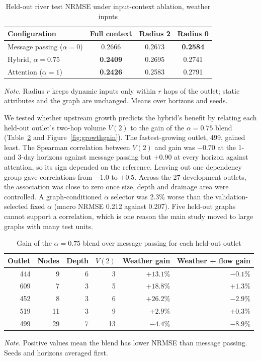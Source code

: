 \begin{table}[htbp]
\caption{Held-out river test NRMSE under input-context ablation, weather inputs}
\label{tab:context}
\centering\small
\begin{tabular}{@{}lccc@{}}
\toprule
Configuration & Full context & Radius 2 & Radius 0 \\
\midrule
Message passing ($\alpha=0$) & 0.2666 & 0.2673 & \textbf{0.2584} \\
Hybrid, $\alpha=0.75$ & \textbf{0.2409} & 0.2695 & 0.2741 \\
Attention ($\alpha=1$) & \textbf{0.2426} & 0.2583 & 0.2791 \\
\bottomrule
\end{tabular}

\vspace{4pt}
\parbox{0.8\textwidth}{\footnotesize\textit{Note.} Radius $r$ keeps dynamic inputs only within $r$ hops of the outlet; static attributes and the graph are unchanged. Means over horizons and seeds.}
\end{table}

We tested whether upstream growth predicts the hybrid's benefit by relating each held-out outlet's two-hop volume $V(2)$ to the gain of the $\alpha=0.75$ blend (Table~\ref{tab:outlets} and Figure~\ref{fig:growthgain}). The fastest-growing outlet, 499, gained least. The Spearman correlation between $V(2)$ and gain was $-0.70$ at the 1- and 3-day horizons against message passing but $+0.90$ at every horizon against attention, so its sign depended on the reference. Leaving out one dependency group gave correlations from $-1.0$ to $+0.5$. Across the 27 development outlets, the association was close to zero once size, depth and drainage area were controlled. A graph-conditioned $\alpha$ selector was 2.3\% worse than the validation-selected fixed $\alpha$ (macro NRMSE 0.212 against 0.207). Five held-out graphs cannot support a correlation, which is one reason the main study moved to large graphs with many test units.

\begin{table}[htbp]
\caption{Gain of the $\alpha=0.75$ blend over message passing for each held-out outlet}
\label{tab:outlets}
\centering\small
\begin{tabular}{@{}rrrrrr@{}}
\toprule
Outlet & Nodes & Depth & $V(2)$ & Weather gain & Weather + flow gain \\
\midrule
444 & 9 & 6 & 3 & $+13.1\%$ & $-0.1\%$ \\
609 & 7 & 3 & 5 & $+18.8\%$ & $+1.3\%$ \\
452 & 8 & 3 & 6 & $+26.2\%$ & $-2.9\%$ \\
519 & 11 & 3 & 9 & $+2.9\%$ & $+0.3\%$ \\
499 & 29 & 7 & 13 & $-4.4\%$ & $-8.9\%$ \\
\bottomrule
\end{tabular}

\vspace{4pt}
\parbox{0.8\textwidth}{\footnotesize\textit{Note.} Positive values mean the blend has lower NRMSE than message passing. Seeds and horizons averaged first.}
\end{table}

